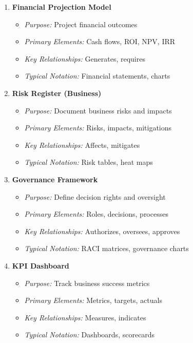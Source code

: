 \documentclass[11pt,letterpaper]{article}
\begin{document}
\begin{enumerate}[label=\textbf{MT\arabic*:}, leftmargin=2.5em]
    \item \textbf{Financial Projection Model}
    \begin{itemize}[nosep]
        \item \textit{Purpose:} Project financial outcomes
        \item \textit{Primary Elements:} Cash flows, ROI, NPV, IRR
        \item \textit{Key Relationships:} Generates, requires
        \item \textit{Typical Notation:} Financial statements, charts
    \end{itemize}
    
    \item \textbf{Risk Register (Business)}
    \begin{itemize}[nosep]
        \item \textit{Purpose:} Document business risks and impacts
        \item \textit{Primary Elements:} Risks, impacts, mitigations
        \item \textit{Key Relationships:} Affects, mitigates
        \item \textit{Typical Notation:} Risk tables, heat maps
    \end{itemize}
    
    \item \textbf{Governance Framework}
    \begin{itemize}[nosep]
        \item \textit{Purpose:} Define decision rights and oversight
        \item \textit{Primary Elements:} Roles, decisions, processes
        \item \textit{Key Relationships:} Authorizes, oversees, approves
        \item \textit{Typical Notation:} RACI matrices, governance charts
    \end{itemize}
    
    \item \textbf{KPI Dashboard}
    \begin{itemize}[nosep]
        \item \textit{Purpose:} Track business success metrics
        \item \textit{Primary Elements:} Metrics, targets, actuals
        \item \textit{Key Relationships:} Measures, indicates
        \item \textit{Typical Notation:} Dashboards, scorecards
    \end{itemize}
    

\end{enumerate}
\end{document}
